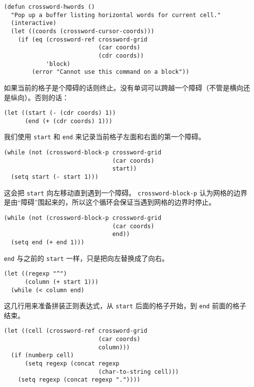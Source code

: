 \begin{verbatim}
(defun crossword-hwords ()
  "Pop up a buffer listing horizontal words for current cell."
  (interactive)
  (let ((coords (crossword-cursor-coords)))
    (if (eq (crossword-ref crossword-grid
                           (car coords)
                           (cdr coords))
            'block)
        (error "Cannot use this command on a block"))
\end{verbatim}

如果当前的格子是个障碍的话则终止。没有单词可以跨越一个障碍（不管是横向还是纵向）。否则的话：

\begin{verbatim}
(let ((start (- (cdr coords) 1))
      (end (+ (cdr coords) 1)))
\end{verbatim}

我们使用 \texttt{start} 和 \texttt{end} 来记录当前格子左面和右面的第一个障碍。

\begin{verbatim}
(while (not (crossword-block-p crossword-grid
                               (car coords)
                               start))
  (setq start (- start 1)))
\end{verbatim}

这会把 \texttt{start} 向左移动直到遇到一个障碍。 \texttt{crossword-block-p} 认为网格的边界是由“障碍”围起来的，所以这个循环会保证当遇到网格的边界时停止。

\begin{verbatim}
(while (not (crossword-block-p crossword-grid
                               (car coords)
                               end))
  (setq end (+ end 1)))
\end{verbatim}

 \texttt{end} 与之前的 \texttt{start} 一样，只是把向左替换成了向右。

\begin{verbatim}
(let ((regexp "^")
      (column (+ start 1)))
  (while (< column end)
\end{verbatim}

这几行用来准备拼装正则表达式，从 \texttt{start} 后面的格子开始，到 \texttt{end} 前面的格子结束。

\begin{verbatim}
(let ((cell (crossword-ref crossword-grid
                           (car coords)
                           column)))
  (if (numberp cell)
      (setq regexp (concat regexp
                           (char-to-string cell)))
    (setq regexp (concat regexp "."))))
\end{verbatim}


